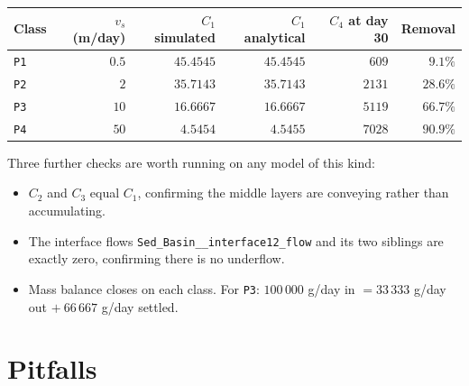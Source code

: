 \documentclass[11pt,a4paper]{article}
\newcommand{\code}[1]{\texttt{\small #1}}
\begin{document}
\begin{center}
\begin{tabular}{lrrrrr}
\toprule
Class & $v_s$ (m/day) & $C_1$ simulated & $C_1$ analytical & $C_4$ at day 30 & Removal \\
\midrule
\code{P1} & $0.5$ & $45.4545$ & $45.4545$ & $609$  & $9.1\%$ \\
\code{P2} & $2$   & $35.7143$ & $35.7143$ & $2131$ & $28.6\%$ \\
\code{P3} & $10$  & $16.6667$ & $16.6667$ & $5119$ & $66.7\%$ \\
\code{P4} & $50$  & $4.5454$  & $4.5455$  & $7028$ & $90.9\%$ \\
\bottomrule
\end{tabular}
\end{center}

Three further checks are worth running on any model of this kind:

\begin{itemize}[leftmargin=1.4em]
\item $C_2$ and $C_3$ equal $C_1$, confirming the middle layers are conveying
      rather than accumulating.
\item The interface flows \code{Sed\_Basin\_\_interface12\_flow} and its two
      siblings are exactly zero, confirming there is no underflow.
\item Mass balance closes on each class. For \code{P3}: $100\,000$ g/day in
      $=33\,333$ g/day out $+\ 66\,667$ g/day settled.
\end{itemize}

\section{Pitfalls}
\end{document}
